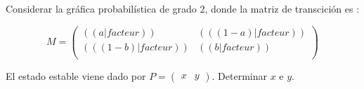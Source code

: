 \exercice
Considerar la gráfica probabilística de grado 2, donde la matriz de transcición es :

\[
M=\begin{pmatrix}
  (( a|facteur )) & (( (1-a)|facteur )) \\
  (( (1-b)|facteur )) & (( b|facteur )) \\
\end{pmatrix}
\]

El estado estable viene dado por $P=\begin{pmatrix}x&y\end{pmatrix}$. Determinar $x$ e $y$.

